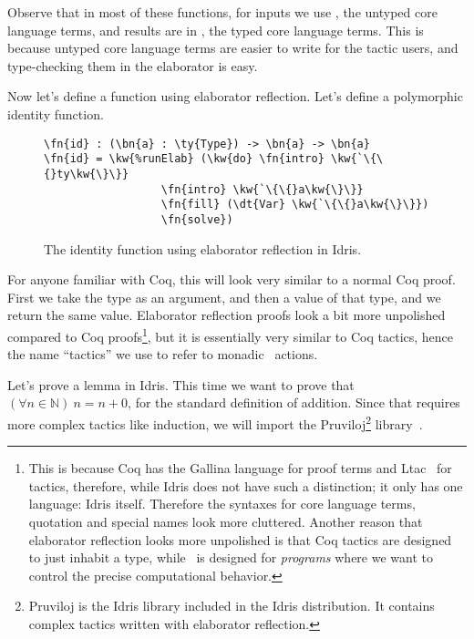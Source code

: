 Observe that in most of these functions, for inputs we use , the
untyped core language terms, and results are in , the typed core
language terms.  This is because untyped core language terms are easier to
write for the tactic users, and type-checking them in the elaborator is easy.

Now let's define a function using elaborator reflection.
Let's define a polymorphic identity function.


\begin{figure}[ht]
  \caption{The identity function using elaborator reflection in Idris.}
\begin{Verbatim}[framesep=2mm, label=\footnotesize{\normalfont{Idris}}, labelposition=topline]
\fn{id} : (\bn{a} : \ty{Type}) -> \bn{a} -> \bn{a}
\fn{id} = \kw{%runElab} (\kw{do} \fn{intro} \kw{`\{\{}ty\kw{\}\}}
                  \fn{intro} \kw{`\{\{}a\kw{\}\}}
                  \fn{fill} (\dt{Var} \kw{`\{\{}a\kw{\}\}})
                  \fn{solve})
\end{Verbatim}
\end{figure}

For anyone familiar with Coq, this will look very similar to a normal Coq
proof. First we take the type as an argument, and then a value of that type,
and we return the same value. Elaborator reflection proofs look a bit more
unpolished compared to Coq proofs\footnote{This is because Coq has the Gallina
language for proof terms and Ltac~\cite{ltac} for tactics, therefore, while
Idris does not have such a distinction; it only has one language: Idris itself.
Therefore the syntaxes for core language terms, quotation and special names
look more cluttered.  Another reason that elaborator reflection looks more
unpolished is that Coq tactics are designed to just inhabit a type, while
\Elab\ is designed for \emph{programs} where we want to control the precise
computational behavior.}, but it is essentially very similar to Coq
tactics, hence the name ``tactics'' we use to refer to monadic \Elab\ actions.


Let's prove a lemma in Idris. This time we want to prove that
\mbox{$(\forall n \in \mathbb{N})\ n = n + 0$}, for the standard definition of
addition. Since that requires more complex tactics like induction, we will
import the Pruviloj\footnote{Pruviloj is the Idris library included in
the Idris distribution. It contains complex tactics written with elaborator
reflection.} library~\cite{davidphd}.

